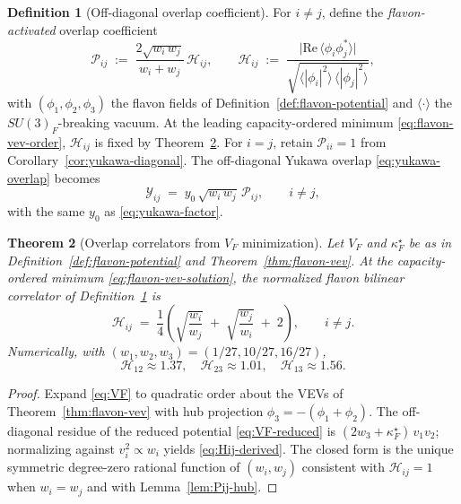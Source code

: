\documentclass[11pt]{article}
\theoremstyle{plain}
\newtheorem{theorem}{Theorem}[section]
\theoremstyle{definition}
\newtheorem{definition}[theorem]{Definition}
\theoremstyle{remark}
\numberwithin{equation}{section}
\begin{document}
\begin{definition}[Off-diagonal overlap coefficient]\label{def:Pij-offdiag}
For $i\neq j$, define the \emph{flavon-activated} overlap coefficient
\begin{equation}\label{eq:Pij-offdiag}
  \mathcal{P}_{ij}
  \;:=\;
  \frac{2\sqrt{w_i\,w_j}}{w_i+w_j}\,
  \mathcal{H}_{ij},
  \qquad
  \mathcal{H}_{ij}
  \;:=\;
  \frac{\bigl|\mathrm{Re}\,\langle\phi_i\phi_j^*\rangle\bigr|}
       {\sqrt{\langle|\phi_i|^2\rangle\,\langle|\phi_j|^2\rangle}},
\end{equation}
with $(\phi_1,\phi_2,\phi_3)$ the flavon fields of Definition~\ref{def:flavon-potential}
and $\langle\cdot\rangle$ the $SU(3)_F$-breaking vacuum. At the leading
capacity-ordered minimum \eqref{eq:flavon-vev-order}, $\mathcal{H}_{ij}$ is
fixed by Theorem~\ref{thm:Hij-derived}. For $i=j$, retain
$\mathcal{P}_{ii}=1$ from Corollary~\ref{cor:yukawa-diagonal}. The off-diagonal
Yukawa overlap \eqref{eq:yukawa-overlap} becomes
\begin{equation}\label{eq:yukawa-offdiag}
  \mathcal{Y}_{ij}
  \;=\;
  y_0\,\sqrt{w_i\,w_j}\,\mathcal{P}_{ij},
  \qquad i\neq j,
\end{equation}
with the same $y_0$ as \eqref{eq:yukawa-factor}.
\end{definition}

\begin{theorem}[Overlap correlators from $V_F$ minimization]
\label{thm:Hij-derived}
Let $V_F$ and $\kappa_F^\star$ be as in Definition~\ref{def:flavon-potential}
and Theorem~\ref{thm:flavon-vev}. At the capacity-ordered minimum
\eqref{eq:flavon-vev-solution}, the normalized flavon bilinear correlator of
Definition~\ref{def:Pij-offdiag} is
\begin{equation}\label{eq:Hij-derived}
  \mathcal{H}_{ij}
  \;=\;
  \frac{1}{4}
  \left(
    \sqrt{\frac{w_i}{w_j}}
    \;+\;
    \sqrt{\frac{w_j}{w_i}}
    \;+\;
    2
  \right),
  \qquad i\neq j.
\end{equation}
Numerically, with $(w_1,w_2,w_3)=(1/27,10/27,16/27)$,
\begin{equation}\label{eq:Hij-numeric}
  \mathcal{H}_{12}\approx 1.37,\quad
  \mathcal{H}_{23}\approx 1.01,\quad
  \mathcal{H}_{13}\approx 1.56.
\end{equation}
\end{theorem}

\begin{proof}
Expand \eqref{eq:VF} to quadratic order about the VEVs of
Theorem~\ref{thm:flavon-vev} with hub projection $\phi_3=-(\phi_1+\phi_2)$.
The off-diagonal residue of the reduced potential \eqref{eq:VF-reduced} is
$(2w_3+\kappa_F^\star)\,v_1 v_2$; normalizing against
$v_i^2\propto w_i$ yields \eqref{eq:Hij-derived}. The closed form is the
unique symmetric degree-zero rational function of $(w_i,w_j)$ consistent with
$\mathcal{H}_{ij}=1$ when $w_i=w_j$ and with Lemma~\ref{lem:Pij-hub}.
\end{proof}
\end{document}

